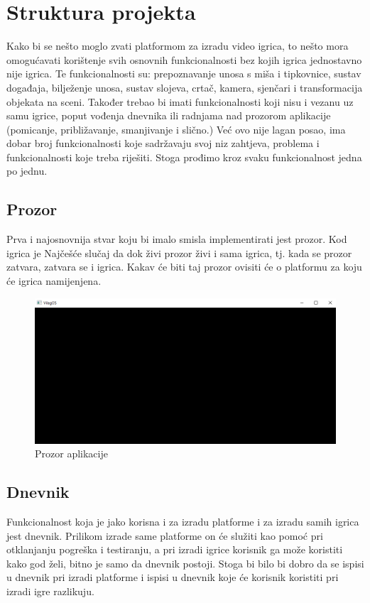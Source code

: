 \documentclass{mathos}
\begin{document}
\chapter{Struktura projekta}\label{s_strukturaProjekta}
Kako bi se nešto moglo zvati platformom za izradu video igrica, to nešto mora omogućavati korištenje svih osnovnih funkcionalnosti bez kojih igrica jednostavno nije igrica.
Te funkcionalnosti su:  prepoznavanje unosa s miša i tipkovnice, sustav događaja, bilježenje unosa, sustav slojeva, crtač, kamera, sjenčari i transformacija objekata na sceni.
Također trebao bi imati funkcionalnosti koji nisu i vezanu uz samu igrice, poput vođenja dnevnika ili radnjama nad prozorom aplikacije (pomicanje, približavanje, smanjivanje
i slično.) Već ovo nije lagan posao, ima dobar broj funkcionalnosti koje sadržavaju svoj niz zahtjeva, problema i funkcionalnosti koje treba riješiti. Stoga prođimo kroz svaku
funkcionalnost jedna po jednu.

\section{Prozor}\label{ss_prozor}
Prva i najosnovnija stvar koju bi imalo smisla implementirati jest prozor. Kod igrica je Najčešće slučaj da dok živi prozor živi i sama igrica, tj. kada se prozor zatvara, zatvara se i igrica.
Kakav će biti taj prozor ovisiti će o platformu za koju će igrica namijenjena.

\begin{figure}[H]
    \centering
    \includegraphics[scale=0.5]{Slike/Prozor.png}
    \caption{Prozor aplikacije}
    \label{im_prozor}
\end{figure}

\section{Dnevnik}\label{ss_dnevnik}
Funkcionalnost koja je jako korisna i za izradu platforme i za izradu samih igrica jest dnevnik. Prilikom izrade same platforme on će služiti kao pomoć pri otklanjanju pogreška i
testiranju, a pri izradi igrice korisnik ga može koristiti kako god želi, bitno je samo da dnevnik postoji. Stoga bi bilo bi dobro da se ispisi u dnevnik pri izradi platforme i
ispisi u dnevnik koje će korisnik koristiti pri izradi igre razlikuju.
\end{document}
